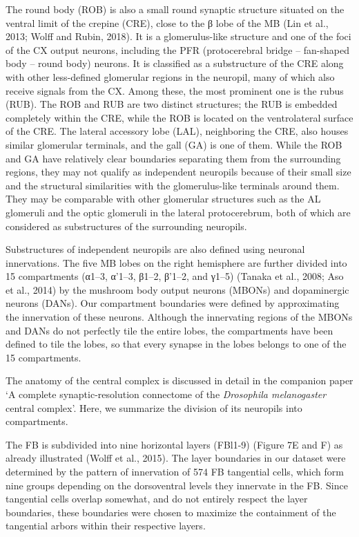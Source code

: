 \documentclass{article}
\begin{document}
The round body (ROB) is also a small round synaptic structure situated on the ventral limit of the crepine (CRE), close to the β lobe of the MB (Lin et al., 2013; Wolff and Rubin, 2018). It is a glomerulus-like structure and one of the foci of the CX output neurons, including the PFR (protocerebral bridge – fan-shaped body – round body) neurons. It is classified as a substructure of the CRE along with other less-defined glomerular regions in the neuropil, many of which also receive signals from the CX. Among these, the most prominent one is the rubus (RUB). The ROB and RUB are two distinct structures; the RUB is embedded completely within the CRE, while the ROB is located on the ventrolateral surface of the CRE. The lateral accessory lobe (LAL), neighboring the CRE, also houses similar glomerular terminals, and the gall (GA) is one of them. While the ROB and GA have relatively clear boundaries separating them from the surrounding regions, they may not qualify as independent neuropils because of their small size and the structural similarities with the glomerulus-like terminals around them. They may be comparable with other glomerular structures such as the AL glomeruli and the optic glomeruli in the lateral protocerebrum, both of which are considered as substructures of the surrounding neuropils.

Substructures of independent neuropils are also defined using neuronal innervations. The five MB lobes on the right hemisphere are further divided into 15 compartments (α1–3, α’1–3, β1–2, β’1–2, and γ1–5) (Tanaka et al., 2008; Aso et al., 2014) by the mushroom body output neurons (MBONs) and dopaminergic neurons (DANs). Our compartment boundaries were defined by approximating the innervation of these neurons. Although the innervating regions of the MBONs and DANs do not perfectly tile the entire lobes, the compartments have been defined to tile the lobes, so that every synapse in the lobes belongs to one of the 15 compartments.


The anatomy of the central complex is discussed in detail in the companion paper ‘A complete synaptic-resolution connectome of the \emph{Drosophila melanogaster} central complex’. Here, we summarize the division of its neuropils into compartments.

The FB is subdivided into nine horizontal layers (FBl1-9) (Figure 7E and F) as already illustrated (Wolff et al., 2015). The layer boundaries in our dataset were determined by the pattern of innervation of 574 FB tangential cells, which form nine groups depending on the dorsoventral levels they innervate in the FB. Since tangential cells overlap somewhat, and do not entirely respect the layer boundaries, these boundaries were chosen to maximize the containment of the tangential arbors within their respective layers.
\end{document}
